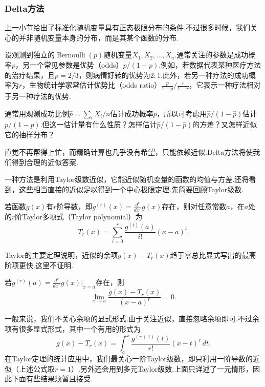 \subsubsection{Delta方法}\label{sec:5.5.4}
上一小节给出了标准化随机变量具有正态极限分布的条件.不过很多时候，我们关心的并非随机变量本身的分布，而是其某个函数的分布.
\begin{example}[优势的估计]\label{ex:5.5.19}
设观测到独立的$\operatorname{Bernoulli}(p)$随机变量$X_1,X_2,\ldots,X_n$.通常关注的参数是成功概率$p$，另一个常见参数是优势（odds）$p/(1-p)$.例如，若数据代表某种医疗方法的治疗结果，且$p=2/3$，则病情好转的优势为$2:1$.此外，若另一种疗法的成功概率为$r$，生物统计学家常估计优势比（odds ratio）$\frac p{1-p}/\frac r{1-r}$，它表示一种疗法相对于另一种疗法的优势.

通常用观测成功比例$\hat p=\sum_iX_i/n$估计成功概率$p$，所以可考虑用$\hat p/(1-\hat p)$估计$p/(1-p)$.但这一估计量有什么性质？怎样估计$\hat p/(1-\hat p)$的方差？又怎样近似它的抽样分布？

直觉不再帮得上忙，而精确计算也几乎没有希望，只能依赖近似.Delta方法将使我们得到合理的近似答案.
\end{example}
一种方法是利用Taylor级数近似，它能近似随机变量的函数的均值与方差.还将看到，这些相当直接的近似足以得到一个中心极限定理.先简要回顾Taylor级数.
\begin{definition}\label{def:5.5.20}
若函数$g(x)$有$r$阶导数，即$g^{(r)}(x)=\frac{d^r}{dx^r}g(x)$存在，则对任意常数$a$，在$a$处的$r$阶Taylor多项式（Taylor polynomial）为
$$T_r(x)=\sum_{i=0}^r\frac{g^{(i)}(a)}{i!}(x-a)^i.$$
\end{definition}
Taylor的主要定理说明，近似的余项$g(x)-T_r(x)$趋于零总比显式写出的最高阶项更快.这里不证明.
\begin{theorem}[Taylor]\label{thm:5.5.21}
若$g^{(r)}(a)=\frac{d^r}{dx^r}g(x)|_{x=a}$存在，则
$$\lim_{x\to a}\frac{g(x)-T_r(x)}{(x-a)^r}=0.$$
\end{theorem}
一般来说，我们不关心余项的显式形式.由于关注近似，直接忽略余项即可.不过余项有很多显式形式，其中一个有用的形式为
$$g(x)-T_r(x)=\int_a^x\frac{g^{(r+1)}(t)}{r!}(x-t)^r\,dt.$$
在Taylor定理的统计应用中，我们最关心一阶Taylor级数，即只利用一阶导数的近似（上述公式取$r=1$）.另外还会用到多元Taylor级数.上面只详述了一元情形，因此下面有些结果须暂且接受.

